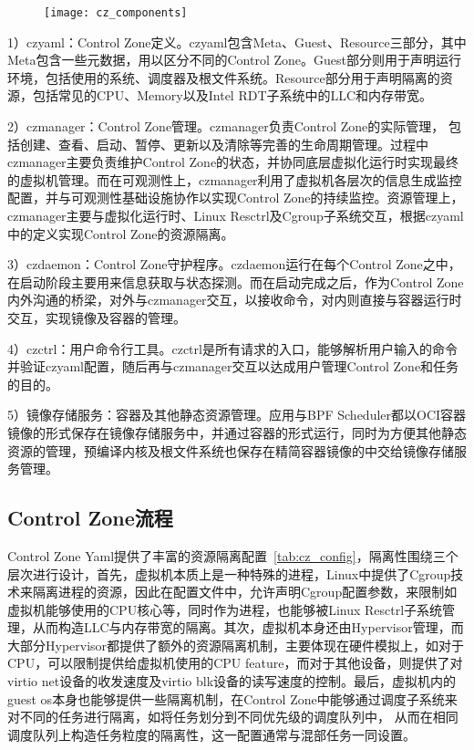 \begin{figure}[!htbp]
    \centering
    \texttt{[image: cz\_components]}
    \label{fig:cz_components}
\end{figure}

1）czyaml：Control Zone定义。czyaml包含Meta、Guest、Resource三部分，其中Meta包含一些元数据，用以区分不同的Control Zone。Guest部分则用于声明运行环境，包括使用的系统、调度器及根文件系统。Resource部分用于声明隔离的资源，包括常见的CPU、Memory以及Intel RDT子系统中的LLC和内存带宽。

2）czmanager：Control Zone管理。czmanager负责Control Zone的实际管理， 包括创建、查看、启动、暂停、更新以及清除等完善的生命周期管理。过程中czmanager主要负责维护Control Zone的状态，并协同底层虚拟化运行时实现最终的虚拟机管理。而在可观测性上，czmanager利用了虚拟机各层次的信息生成监控配置，并与可观测性基础设施协作以实现Control Zone的持续监控。资源管理上，czmanager主要与虚拟化运行时、Linux Resctrl及Cgroup子系统交互，根据czyaml中的定义实现Control Zone的资源隔离。

3）czdaemon：Control Zone守护程序。czdaemon运行在每个Control Zone之中，在启动阶段主要用来信息获取与状态探测。而在启动完成之后，作为Control Zone内外沟通的桥梁，对外与czmanager交互，以接收命令，对内则直接与容器运行时交互，实现镜像及容器的管理。

4）czctrl：用户命令行工具。czctrl是所有请求的入口，能够解析用户输入的命令并验证czyaml配置，随后再与czmanager交互以达成用户管理Control Zone和任务的目的。

5）镜像存储服务：容器及其他静态资源管理。应用与BPF Scheduler都以OCI容器镜像的形式保存在镜像存储服务中，并通过容器的形式运行，同时为方便其他静态资源的管理，预编译内核及根文件系统也保存在精简容器镜像的中交给镜像存储服务管理。

\subsection{Control Zone流程}



Control Zone Yaml提供了丰富的资源隔离配置~\ref{tab:cz_config}，隔离性围绕三个层次进行设计，首先，虚拟机本质上是一种特殊的进程，Linux中提供了Cgroup技术来隔离进程的资源，因此在配置文件中，允许声明Cgroup配置参数，来限制如虚拟机能够使用的CPU核心等，同时作为进程，也能够被Linux Resctrl子系统管理，从而构造LLC与内存带宽的隔离。其次，虚拟机本身还由Hypervisor管理，而大部分Hypervisor都提供了额外的资源隔离机制，主要体现在硬件模拟上，如对于CPU，可以限制提供给虚拟机使用的CPU feature，而对于其他设备，则提供了对virtio net设备的收发速度及virtio blk设备的读写速度的控制。最后，虚拟机内的guest os本身也能够提供一些隔离机制，在Control Zone中能够通过调度子系统来对不同的任务进行隔离，如将任务划分到不同优先级的调度队列中， 从而在相同调度队列上构造任务粒度的隔离性，这一配置通常与混部任务一同设置。

